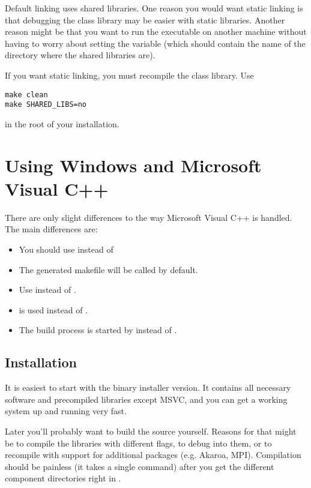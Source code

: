 Default linking uses shared libraries. One
reason you would want static linking is that debugging 
the {\opp} class library may be easier with static libraries. 
Another reason might be that you want to run the executable on 
another machine without having to worry about setting the 
 variable (which should contain the name
of the directory where the {\opp} shared libraries are).

If you want static linking, you must
recompile the {\opp} class library. Use

\begin{verbatim}
make clean
make SHARED_LIBS=no
\end{verbatim}

in the root of your {\opp} installation.

\section{Using Windows and Microsoft Visual C++}

There are only slight differences to the way Microsoft Visual C++
is handled. The main differences are:
\begin{itemize}
  \item{You should use  instead of }
  \item{The generated makefile will be called  by default.}
  \item{Use  instead of .}
  \item{ is used instead of .}
  \item{The build process is started by  instead of .}
\end{itemize}

\subsection{Installation}

It is easiest to start with the binary installer version.
It contains all necessary software and precompiled 
libraries except MSVC, and you can get a 
working system up and running very fast.

Later you'll probably want to build the source yourself.
Reasons for that might be to compile the libraries
with different flags, to debug into them, or to recompile
with support for additional packages (e.g. Akaroa, MPI).
Compilation should be painless (it takes a single
 command) after you get the different
component directories right in .


